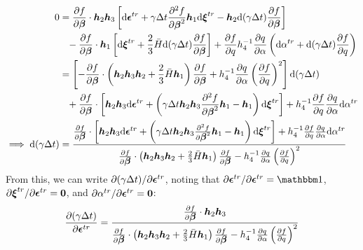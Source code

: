 \documentclass[10pt]{article}
\begin{document}
\begin{equation}
\begin{aligned}
0 &=
\frac{\partial f}{\partial \mbox{\boldmath$\beta$}}\cdot
\mbox{\boldmath$ h$}_2
\mbox{\boldmath$ h$}_3
\left[
 \mathrm{d}\mbox{\boldmath$\epsilon$}^{tr}
 +\gamma\Delta t
\frac{\partial^2 f}{\partial \mbox{\boldmath$\beta$}^2}
\mbox{\boldmath$ h$}_1
\mathrm{d}\mbox{\boldmath$\xi$}^{tr}
- \mbox{\boldmath$ h$}_2
\mathrm{d}(\gamma\Delta t)\frac{\partial f}{\partial\mbox{\boldmath$\beta$}}
\right]\\
&\phantom{=} - \frac{\partial f}{\partial \mbox{\boldmath$\beta$}}\cdot\mbox{\boldmath$ h$}_1
\left[
\mathrm{d}\mbox{\boldmath$\xi$}^{tr} +
\frac{2}{3}\bar{H}
\mathrm{d}(\gamma\Delta t)\frac{\partial f}{\partial\mbox{\boldmath$\beta$}}
\right]
 + \frac{\partial f}{\partial q}h_4^{-1}
{\frac{\partial q}{\partial \alpha}\left(
\mathrm{d}\alpha^{tr} + \mathrm{d}(\gamma\Delta t)
\frac{\partial f}{\partial q}\right)}\\
&=
\left[
-\frac{\partial f}{\partial \mbox{\boldmath$\beta$}}\cdot
\left(
\mbox{\boldmath$ h$}_2\mbox{\boldmath$ h$}_3\mbox{\boldmath$ h$}_2
 +
\frac{2}{3}\bar{H}\mbox{\boldmath$ h$}_1
\right)
\frac{\partial f}{\partial\mbox{\boldmath$\beta$}}
 + h_4^{-1}
{\frac{\partial q}{\partial \alpha}
\left(\frac{\partial f}{\partial q}\right)^2}
\right]\mathrm{d}(\gamma\Delta t)\\
&\phantom{=}+
\frac{\partial f}{\partial \mbox{\boldmath$\beta$}}\cdot\left[
\mbox{\boldmath$ h$}_2\mbox{\boldmath$ h$}_3
 \mathrm{d}\mbox{\boldmath$\epsilon$}^{tr}
+
\left(\gamma\Delta t\mbox{\boldmath$ h$}_2\mbox{\boldmath$ h$}_3
\frac{\partial^2 f}{\partial \mbox{\boldmath$\beta$}^2}\mbox{\boldmath$ h$}_1 -\mbox{\boldmath$ h$}_1
\right)\mathrm{d}\mbox{\boldmath$\xi$}^{tr} \right]
 +h_4^{-1}\frac{\partial f}{\partial q}
{\frac{\partial q}{\partial \alpha}
\mathrm{d}\alpha^{tr}}\\
\implies \mathrm{d}(\gamma\Delta t) &=
\frac
{\frac{\partial f}{\partial \mbox{\boldmath$\beta$}}\cdot\left[
\mbox{\boldmath$ h$}_2\mbox{\boldmath$ h$}_3
 \mathrm{d}\mbox{\boldmath$\epsilon$}^{tr}
+
\left(\gamma\Delta t\mbox{\boldmath$ h$}_2\mbox{\boldmath$ h$}_3
\frac{\partial^2 f}{\partial \mbox{\boldmath$\beta$}^2}\mbox{\boldmath$ h$}_1 -\mbox{\boldmath$ h$}_1
\right)\mathrm{d}\mbox{\boldmath$\xi$}^{tr} \right]
 +h_4^{-1}\frac{\partial f}{\partial q}
{\frac{\partial q}{\partial \alpha}
\mathrm{d}\alpha^{tr}}}
{\frac{\partial f}{\partial \mbox{\boldmath$\beta$}}\cdot
\left(
\mbox{\boldmath$ h$}_2\mbox{\boldmath$ h$}_3\mbox{\boldmath$ h$}_2
 +
\frac{2}{3}\bar{H}\mbox{\boldmath$ h$}_1
\right)
\frac{\partial f}{\partial\mbox{\boldmath$\beta$}}
 - h_4^{-1}
{\frac{\partial q}{\partial \alpha}
\left(\frac{\partial f}{\partial q}\right)^2}}
\end{aligned}
\end{equation}
From this, we can write $\partial (\gamma\Delta t)/\partial \mbox{\boldmath$\epsilon$}^{tr}$, noting that $\partial \Bepsilon^{tr}/\partial \Bepsilon^{tr} = \iso$, $\partial \mbox{\boldmath$\xi$}^{tr}/\partial \mbox{\boldmath$\epsilon$}^{tr} = \mathbf{0}$, and $\partial \alpha^{tr}/\partial \mbox{\boldmath$\epsilon$}^{tr} = \mathbf{0}$:
\begin{equation}
\frac{\partial (\gamma\Delta t)}{\partial \mbox{\boldmath$\epsilon$}^{tr}} =
\frac
{\frac{\partial f}{\partial \mbox{\boldmath$\beta$}}\cdot
\mbox{\boldmath$ h$}_2\mbox{\boldmath$ h$}_3}
{\frac{\partial f}{\partial \mbox{\boldmath$\beta$}}\cdot
\left(
\mbox{\boldmath$ h$}_2\mbox{\boldmath$ h$}_3\mbox{\boldmath$ h$}_2
 +
\frac{2}{3}\bar{H}\mbox{\boldmath$ h$}_1
\right)
\frac{\partial f}{\partial\mbox{\boldmath$\beta$}}
 - h_4^{-1}
{\frac{\partial q}{\partial \alpha}
\left(\frac{\partial f}{\partial q}\right)^2}}
\end{equation}
\end{document}

